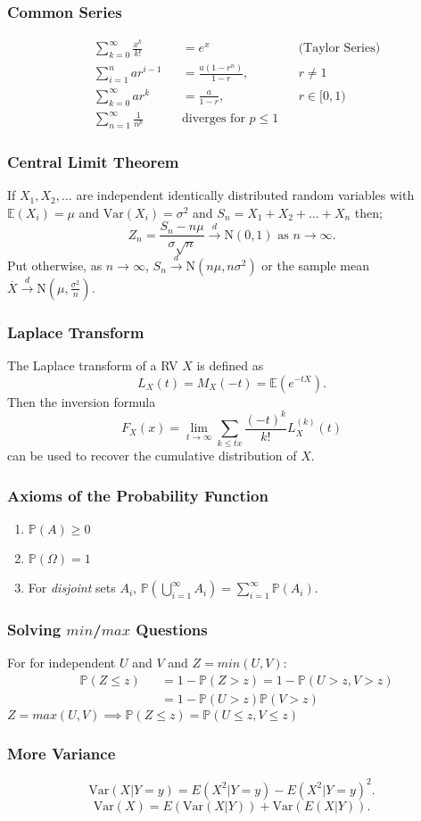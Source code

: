 \documentclass[titlepage,twocolumn]{article}
\begin{document}
\subsubsection*{Common Series}
\begin{align*}
    &\sum_{k=0}^{\infty}\frac{x^k}{k!} &&= e^x &&\mbox{(Taylor Series)} \\
    &\sum_{i=1}^{n} a r^{i-1} &&= \frac{a(1-r^n)}{1-r}, && r \neq 1 \\
    &\sum_{k=0}^{\infty} a r^k &&= \frac{a}{1-r}, && r \in [0,1) \\
    &\sum_{n=1}^{\infty} \frac{1}{n^p} && \mbox{diverges for } p \leq 1
\end{align*}
\subsubsection*{Central Limit Theorem}
If $X_1, X_2,\dots$ are independent identically distributed random variables with $\mathbb{E}(X_i)=\mu$ and $\mbox{Var}(X_i)=\sigma^2$ and $S_n = X_1 + X_2 + \dots + X_n$ then;
$$Z_n = \frac{S_n - n\mu}{\sigma \sqrt{n}} \stackrel{d}{\rightarrow} \mbox{N}(0,1) \mbox{ as } n\rightarrow \infty.$$ Put otherwise, as $n \rightarrow \infty$, $S_n \stackrel{d}{\rightarrow} \mbox{N}(n\mu, n\sigma^2)$ or the sample mean $\overline{X} \stackrel{d}{\rightarrow} \mbox{N}(\mu, \frac{\sigma^2}{n})$.
\subsubsection*{Laplace Transform}
The Laplace transform of a RV $X$ is defined as $$L_X(t)=M_X(-t)=\mathbb{E}(e^{-tX}).$$ Then the inversion formula $$F_X(x) = \lim_{t\rightarrow \infty} \sum_{k\leq tx} \frac{(-t)^k}{k!}L_X^{(k)}(t)$$ can be used to recover the cumulative distribution of $X$.
\subsubsection*{Axioms of the Probability Function}
\begin{enumerate}
    \item $\mathbb{P}(A) \geq 0$
    \item $\mathbb{P}(\Omega) = 1$
    \item For \textit{disjoint} sets $A_i$, $\mathbb{P}(\bigcup_{i=1}^{\infty} A_i) = \sum_{i=1}^{\infty} \mathbb{P}(A_i)$.
\end{enumerate}
\subsubsection*{Solving $min$/$max$ Questions}
For for independent $U$ and $V$ and $Z = min(U, V)$:
\begin{align*}
    &\mathbb{P}(Z \leq z) &&= 1 - \mathbb{P}(Z > z) = 1 - \mathbb{P}(U > z, V > z) \\
    &   &&= 1 - \mathbb{P}(U > z)\mathbb{P}(V > z)
\end{align*}
$Z = max(U, V) \implies \mathbb{P}(Z \leq z) = \mathbb{P}(U \leq z, V \leq z)$
\subsubsection*{More Variance}
$$\mbox{Var}(X|Y=y) = E(X^2|Y=y) - E(X^2|Y=y)^2.$$
$$\mbox{Var}(X) = E(\mbox{Var}(X|Y)) + \mbox{Var}(E(X|Y)).$$
\end{document}
